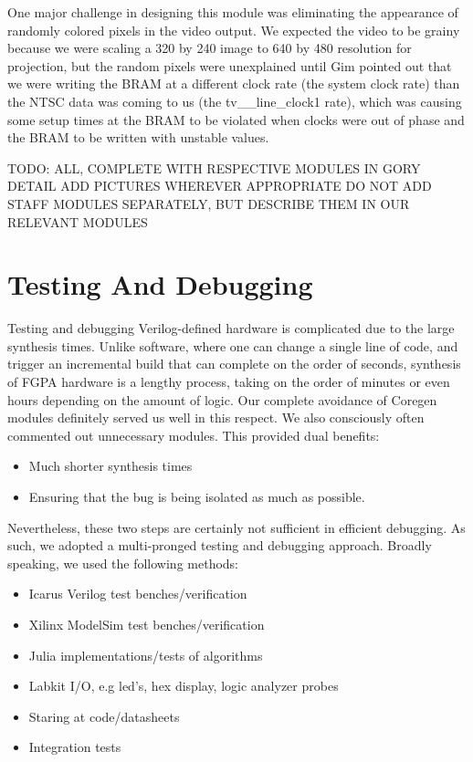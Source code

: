 \documentclass{article}
\begin{document}
One major challenge in designing this module was eliminating the appearance of randomly colored pixels in the video output. We expected the video to be grainy because we were scaling a 320 by 240 image to 640 by 480 resolution for projection, but the random pixels were unexplained until Gim pointed out that we were writing the BRAM at a different clock rate (the system clock rate) than the NTSC data was coming to us (the tv\_\in\_line\_clock1 rate), which was causing some setup times at the BRAM to be violated when clocks were out of phase and the BRAM to be written with unstable values.


TODO: ALL, COMPLETE WITH RESPECTIVE MODULES IN GORY DETAIL
ADD PICTURES WHEREVER APPROPRIATE
DO NOT ADD STAFF MODULES SEPARATELY, BUT DESCRIBE THEM IN OUR RELEVANT MODULES

\section{Testing And Debugging}

Testing and debugging Verilog-defined hardware is complicated due to the large synthesis times.
Unlike software, where one can change a single line of code,
and trigger an incremental build that can complete on the order of seconds,
synthesis of FGPA hardware is a lengthy process,
taking on the order of minutes or even hours depending on the amount of logic.
Our complete avoidance of Coregen modules definitely served us well in this respect.
We also consciously often commented out unnecessary modules.
This provided dual benefits:
\begin{itemize}
\item Much shorter synthesis times
\item Ensuring that the bug is being isolated as much as possible.
\end{itemize}
Nevertheless, these two steps are certainly not sufficient in efficient debugging.
As such, we adopted a multi-pronged testing and debugging approach.
Broadly speaking, we used the following methods:
\begin{itemize}
\item Icarus Verilog test benches/verification
\item Xilinx ModelSim test benches/verification
\item Julia implementations/tests of algorithms
\item Labkit I/O, e.g led's, hex display, logic analyzer probes
\item Staring at code/datasheets
\item Integration tests
\end{itemize}
\end{document}
